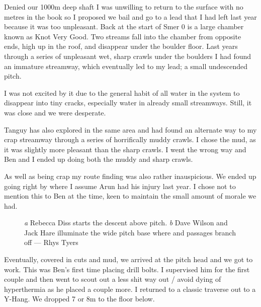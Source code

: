 Denied our 1000m deep shaft I was unwilling to return to the surface with no metres in the book so I proposed we bail and go to a lead that I had left last year because it was too unpleasant. Back at the start of Smer 0 is a large chamber known as Knot Very Good. Two streams fall into the chamber from opposite ends, high up in the roof, and disappear under the boulder floor. Last years through a series of unpleasant wet, sharp crawls under the boulders I had found an immature streamway, which eventually led to my lead; a small undescended pitch.
 
I was not excited by it due to the general habit of all water in the system to disappear into tiny cracks, especially water in already small streamways. Still, it was close and we were desperate.
 
Tanguy has also explored in the same area and had found an alternate way to my crap streamway through a series of horrifically muddy crawls. I chose the mud, as it was slightly more pleasant than the sharp crawls. I went the wrong way and Ben and I ended up doing both the muddy and sharp crawls.
 
As well as being crap my route finding was also rather inauspicious. We ended up going right by where I assume Arun had his injury last year. I chose not to mention this to Ben at the time, keen to maintain the small amount of morale we had.

 \begin{figure}[t!]
\checkoddpage \ifoddpage \forcerectofloat \else \forceversofloat \fi
\centering
\begin{subfigure}[t]{0.685\textwidth}
\centering
{}
 \caption{}\label{water hallelujah}
\end{subfigure}
    \hfill
    \begin{subfigure}[t]{0.305\textwidth}
        \centering
        \caption{} \label{Diss and Dave}
    \end{subfigure}
    \caption{
    \emph{a} Rebecca Diss starts the descent above  pitch.
    \emph{b} Dave Wilson and Jack Hare illuminate the wide pitch base where  and  passages branch off --- Rhys Tyers}
\end{figure}
 
Eventually, covered in cuts and mud, we arrived at the pitch head and we got to work. This was Ben’s first time placing drill bolts. I supervised him for the first couple and then went to scout out a less shit way out / avoid dying of hyperthermia as he placed a couple more. I returned to a classic traverse out to a Y-Hang. We dropped 7 or 8m to the floor below.
 

